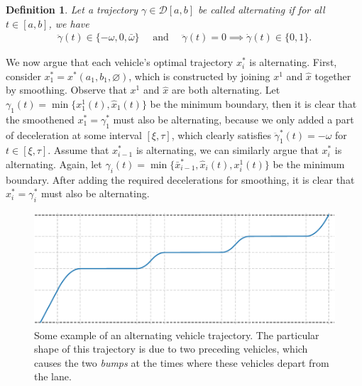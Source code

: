 \documentclass[a4paper]{article}
\theoremstyle{definition}
\theoremstyle{plain}
\newtheorem{define}{Definition\hspace{0.25em}\ignorespaces}
\begin{document}
\begin{define}
  Let a trajectory $\gamma \in \mathcal{D}[a, b]$ be called \emph{alternating} if for all
  $t \in [a, b]$, we have
  \begin{align}
    \ddot{\gamma}(t) \in \{-\omega, 0, \bar{\omega}\} \quad \text{ and } \quad
    \ddot{\gamma}(t) = 0 \implies \dot{\gamma}(t) \in \{0, 1\}.
  \end{align}
\end{define}

We now argue that each vehicle's optimal trajectory $x^{*}_{i}$ is alternating.
First, consider $x^{*}_{1} = x^{*}(a_{1}, b_{1}, \varnothing)$, which is
constructed by joining $x^{1}$ and $\hat{x}$ together by smoothing. Observe that
$x^{1}$ and $\hat{x}$ are both alternating. Let
$\gamma_{1}(t) = \min\{x^{1}_{1}(t), \hat{x}_{1}(t) \}$ be the minimum boundary,
then it is clear that the smoothened $x^{*}_{1} = \gamma_{1}^{*}$ must also be
alternating, because we only added a part of deceleration at some interval
$[\xi, \tau]$, which clearly satisfies $\ddot{\gamma}_{1}^{*}(t) = -\omega$ for
$t \in [\xi,\tau]$.
%
Assume that $x^{*}_{i-1}$ is alternating, we can similarly argue that
$x^{*}_{i}$ is alternating. Again, let
$\gamma_{i}(t) = \min\{\bar{x}^{*}_{i-1}, \hat{x}_{i}(t), x^{1}_{i}(t)\}$ be the
minimum boundary. After adding the required decelerations for smoothing, it is
clear that $x^{*}_{i} = \gamma^{*}_{i}$ must also be alternating.

\begin{figure}
  \centering
  \includegraphics[scale=0.9]{figures/motion/tandem_trajectory}
  \caption{Some example of an alternating vehicle trajectory. The particular
    shape of this trajectory is due to two preceding vehicles, which causes the
    two \emph{bumps} at the times where these vehicles depart from the lane.}
  \label{fig:tandem_trajectory}
\end{figure}
\end{document}
